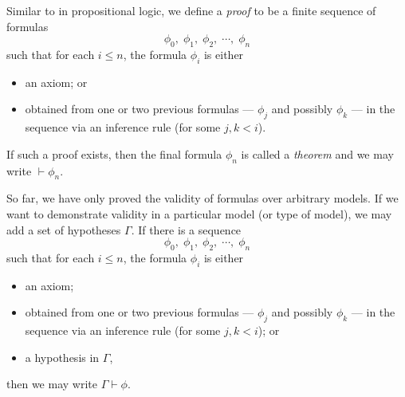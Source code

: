 Similar to in propositional logic, we define a \emph{proof} to be a finite sequence of formulas
%
\[\phi_0,\; \phi_1,\; \phi_2,\; \cdots,\; \phi_n\]
%
such that for each \(i \leq n\), the formula \(\phi_i\) is either
%
\begin{itemize}
    \item an axiom; or
    \item obtained from one or two previous formulas --- \(\phi_j\) and possibly \(\phi_k\) --- in the sequence via an inference rule (for some \(j, k < i\)).
\end{itemize}
%
If such a proof exists, then the final formula \(\phi_n\) is called a \emph{theorem} and we may write \(\vdash \phi_n\).

So far, we have only proved the validity of formulas over arbitrary models. If we want to demonstrate validity in a particular model (or type of model), we may add a set of hypotheses \(\Gamma\). If there is a sequence
%
\[\phi_0,\; \phi_1,\; \phi_2,\; \cdots,\; \phi_n\]
%
such that for each \(i \leq n\), the formula \(\phi_i\) is either
%
\begin{itemize}
    \item an axiom;
    \item obtained from one or two previous formulas --- \(\phi_j\) and possibly \(\phi_k\) --- in the sequence via an inference rule (for some \(j, k < i\)); or
    \item a hypothesis in \(\Gamma\),
\end{itemize}
%
then we may write \(\Gamma\vdash\phi\).

